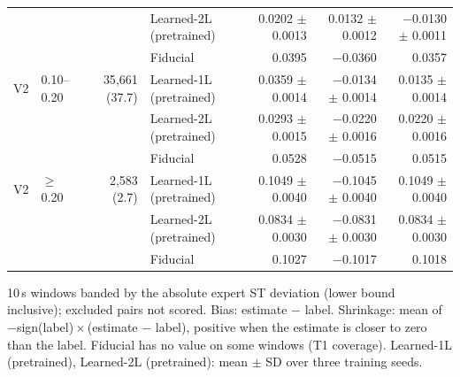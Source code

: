 \begin{table}[htbp]
\begin{tabular}{llrlrrr}
 &  &  & Learned-2L (pretrained) & 0.0202 $\pm$ 0.0013 & 0.0132 $\pm$ 0.0012 & $-$0.0130 $\pm$ 0.0011 \\
 &  &  & Fiducial & 0.0395 & $-$0.0360 & 0.0357 \\
V2 & 0.10--0.20 & 35{,}661 (37.7) & Learned-1L (pretrained) & 0.0359 $\pm$ 0.0014 & $-$0.0134 $\pm$ 0.0014 & 0.0135 $\pm$ 0.0014 \\
 &  &  & Learned-2L (pretrained) & 0.0293 $\pm$ 0.0015 & $-$0.0220 $\pm$ 0.0016 & 0.0220 $\pm$ 0.0016 \\
 &  &  & Fiducial & 0.0528 & $-$0.0515 & 0.0515 \\
V2 & $\geq$\,0.20 & 2{,}583 (2.7) & Learned-1L (pretrained) & 0.1049 $\pm$ 0.0040 & $-$0.1045 $\pm$ 0.0040 & 0.1049 $\pm$ 0.0040 \\
 &  &  & Learned-2L (pretrained) & 0.0834 $\pm$ 0.0030 & $-$0.0831 $\pm$ 0.0030 & 0.0834 $\pm$ 0.0030 \\
 &  &  & Fiducial & 0.1027 & $-$0.1017 & 0.1018 \\
\bottomrule
\end{tabular}

\par\smallskip\footnotesize 10\,s windows banded by the absolute expert ST deviation (lower bound inclusive); excluded pairs not scored. Bias: estimate $-$ label. Shrinkage: mean of $-$sign(label)\,$\times$\,(estimate $-$ label), positive when the estimate is closer to zero than the label. Fiducial has no value on some windows (T1 coverage). Learned-1L (pretrained), Learned-2L (pretrained): mean $\pm$ SD over three training seeds.
\end{table}
